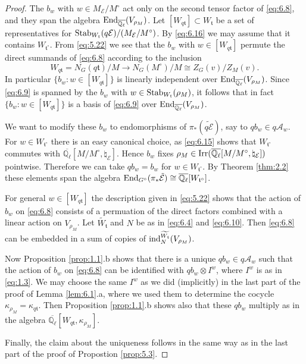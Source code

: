 \documentclass[11pt]{amsart}
\theoremstyle{definition}
\newcommand{\mc}{\mathcal}
\newcommand{\Q}{\mathbb Q}
\def\End{{\rm End}}
\def\Irr{{\rm Irr}}
\def\cE{{\mathcal E}}
\def\ind{{\rm ind}}
\def\ft{{\mathfrak t}}
\def\Stab{{\rm Stab}}
\begin{document}
\begin{proof}
The $b_w$ with $w \in M_\cE / M^\circ$ act only on the second tensor
factor of \eqref{eq:6.8}, and they span the algebra $\End_{\overline{\Q_{\ell}}}
(V_{\rho_M})$. Let $[W_{q \ft}] \subset W_\ft$ be a set of representatives
for $\Stab_{W_\ft}(q \cE) / (M_\cE / M^\circ)$. By \eqref{eq:6.16} we may 
assume that it contains $W_{\ft^\circ}$. 
From \eqref{eq:5.22} we see that the $b_w$ with $w \in [W_{q \ft}]$ permute 
the direct summands of \eqref{eq:6.8} according to the inclusion
\[
W_{q \ft} = N_G (q \ft) / M \to N_G (M^\circ) / M \cong Z_G (v) / Z_M (v) . 
\]
In particular $\{ b_w : w \in [W_{q \ft}] \}$ is linearly independent over
$\End_{\overline{\Q_{\ell}}}(V_{\rho_M})$. Since \eqref{eq:6.9} is spanned
by the $b_w$ with $w \in \Stab_{W_\ft}(\rho_M)$, it follows that
in fact $\{ b_w : w \in [W_{q \ft}] \}$ is a basis of \eqref{eq:6.9} over
$\End_{\overline{\Q_{\ell}}}(V_{\rho_M})$.

We want to modify these $b_w$ to endomorphisms of $\pi_* (\widetilde{q \cE})$,
say to $q b_w \in q \mc A_w$. For $w \in W_{\ft^\circ}$ there is an easy
canonical choice, as \eqref{eq:6.15} shows that $W_{\ft^\circ}$ commutes with
$\overline{\Q_{\ell}}[M / M^\circ,\natural_\cE]$. Hence $b_w$ fixes
$\rho_M \in \Irr (\overline{\Q_{\ell}}[M / M^\circ,\natural_\cE])$ pointwise.
Therefore we can take $q b_w = b_w$ for $w \in W_{\ft^\circ}$. By Theorem 
\ref{thm:2.2} these elements span the algebra $\End_{G^\circ}(\pi_* \tilde{\cE})
\cong \overline{\Q_{\ell}}[W_{\ft^\circ}]$.

For general $w \in [W_{q \ft}]$ the description given in \eqref{eq:5.22} shows
that the action of $b_w$ on \eqref{eq:6.8} consists of a permuation of the
direct factors combined with a linear action on $V_{\rho_M}$. 
Let $\widetilde{W_\ft}$ and $N$ be as in \eqref{eq:6.4} and \eqref{eq:6.10}.
Then \eqref{eq:6.8} can be embedded in a sum of copies of
$\ind_N^{\widetilde{W_\ft}}(V_{\rho_M})$. 

Now Proposition \ref{prop:1.1}.b
shows that there is a unique $q b_w \in q \mc A_w$ such that the action of
$b_w$ on \eqref{eq:6.8} can be identified with $q b_w \otimes I^w$, where
$I^w$ is as in \eqref{eq:1.3}. We may choose the same $I^w$ as we did
(implicitly) in the last part of the proof of Lemma \ref{lem:6.1}.a, where
we used them to determine the cocycle $\kappa_{\rho_M} = \kappa_{q \ft}$.
Then Proposition \ref{prop:1.1}.b shows also that these $q b_w$ multiply 
as in the algebra $\overline{\Q_{\ell}}[W_{q \ft},\kappa_{\rho_M}]$. 

Finally, the claim about the uniqueness follows in the same way as in the
last part of the proof of Propostion \ref{prop:5.3}.
\end{proof}
\end{document}
